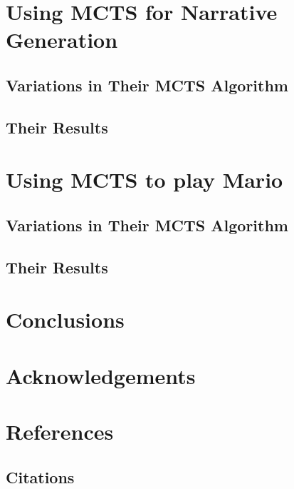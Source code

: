 \documentclass{sig-alternate}
\begin{document}
\section{Using MCTS for Narrative Generation}

\subsection{Variations in Their MCTS Algorithm}

\subsection{Their Results}

\section{Using MCTS to play Mario}

\subsection{Variations in Their MCTS Algorithm}

\subsection{Their Results}

\section{Conclusions}

\section{Acknowledgements}

\section{References}

\subsection{Citations}


  
\end{document}
